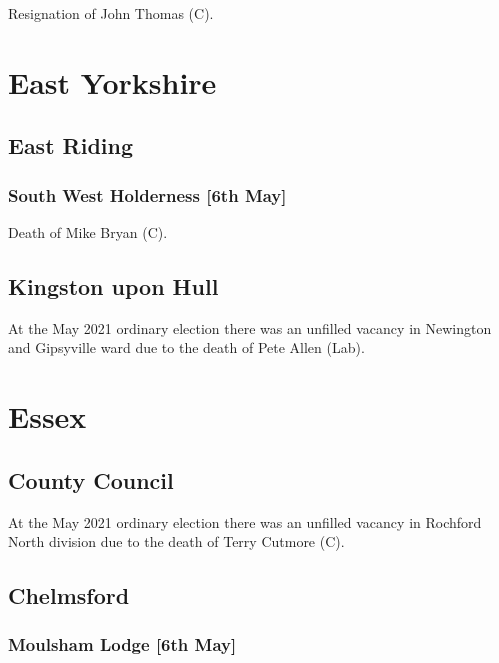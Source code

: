 \documentclass[a4paper,openany]{book}
\begin{document}
\begin{resultsiii}
Resignation of John Thomas (C).

\section{East Yorkshire}

\subsection*{East Riding}

\subsubsection*{South West Holderness \hspace*{\fill}\nolinebreak[1]%
	\enspace\hspace*{\fill}
	[6th May]}


Death of Mike Bryan (C).

\subsection*{Kingston upon Hull}

At the May 2021 ordinary election there was an unfilled vacancy in Newington and Gipsyville ward due to the death of Pete Allen (Lab).

\section{Essex}

\subsection*{County Council}

At the May 2021 ordinary election there was an unfilled vacancy in Rochford North division due to the death of Terry Cutmore (C).

\subsection*{Chelmsford}

\subsubsection*{Moulsham Lodge \hspace*{\fill}\nolinebreak[1]%
	\enspace\hspace*{\fill}
	[6th May]}


\end{resultsiii}
\end{document}
